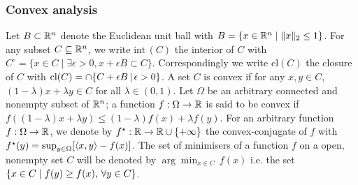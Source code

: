 \subsubsection{Convex analysis}
Let $B\subset\mathbb R^{n}$ denote the Euclidean unit ball with $B=\{x\in\mathbb R^{n}\mid \|x\|_{2}\le 1\}$. For any subset $C\subseteq\mathbb R^{n}$, we write $\mathrm{int}\,(C)$ the interior of $C$ with $C^{\circ}=\{x\in C \mid \exists \epsilon>0, x+\epsilon B \subset C\}$. Correspondingly we write $\mathrm{cl}(C)$ the closure of $C$ with $\mathrm{cl}(C) = \cap\{C+\epsilon B\,|\, \epsilon>0\}$. A set $C$ is convex if for any $x,y\in C$, $(1-\lambda)x+\lambda y\in C$ for all $\lambda\in(0,1)$. Let $\Omega$ be an arbitrary connected and nonempty subset of $\mathbb R^{n}$; a function $f:\Omega\to\mathbb R$ is said to be convex if $f((1-\lambda)x+\lambda y)\le (1-\lambda)f(x)+\lambda f(y)$. For an arbitrary function $f:\Omega\to\mathbb R$, we denote by $f^{\star}:\mathbb R\to \mathbb R\cup\{+\infty\}$ the convex-conjugate of $f$ with $f^{\star}(y)=\sup_{y\in \Omega}[\left\langle x,y \right\rangle-f(x)]$. The set of minimisers of a function $f$ on a open, nonempty set $C$ will be denoted by $\arg\min_{x\in C}\,f(x)$ i.e. the set $\left\{x\in C\mid f(y)\ge f(x), \,\forall y\in C\right\}$. 
